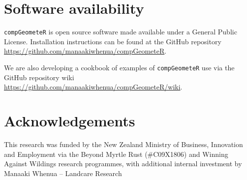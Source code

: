 \documentclass[12pt, a4paper]{article}
\begin{document}
\section{Software availability}

\texttt{compGeometeR} is open source software made available under a General Public License. Installation instructions can be found at the GitHub repository \url{https://github.com/manaakiwhenua/compGeometeR}.

We are also developing a cookbook of examples of \texttt{compGeometeR} use via the GitHub repository wiki \url{https://github.com/manaakiwhenua/compGeometeR/wiki}.

\section{Acknowledgements}

This research was funded by the New Zealand Ministry of Business, Innovation and Employment via the Beyond Myrtle Rust (\#C09X1806) and Winning Against Wildings research programmes, with additional internal investment by Manaaki Whenua -- Landcare Research



\end{document}
